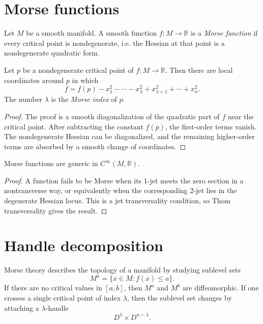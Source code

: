 \section{Morse functions}
\label{section-morse-functions}

\begin{definition}
\label{definition-morse-function}
Let $M$ be a smooth manifold.  A smooth
function $f:M\to\mathbb R$ is a
{\it Morse function} if every critical point
is nondegenerate, i.e. the Hessian at that
point is a nondegenerate quadratic form.
\end{definition}

\begin{theorem}
\label{theorem-morse-lemma}
Let $p$ be a nondegenerate critical point of
$f:M\to\mathbb R$.  Then there are local
coordinates around $p$ in which
$$
f=f(p)-x_1^2-\cdots-x_\lambda^2
+x_{\lambda+1}^2+\cdots+x_n^2.
$$
The number $\lambda$ is the {\it Morse index}
of $p$.
\end{theorem}

\begin{proof}
The proof is a smooth diagonalization of the
quadratic part of $f$ near the critical
point.  After subtracting the constant
$f(p)$, the first-order terms vanish.  The
nondegenerate Hessian can be diagonalized,
and the remaining higher-order terms are
absorbed by a smooth change of coordinates.
\end{proof}

\begin{theorem}
\label{theorem-morse-functions-generic}
Morse functions are generic in
$C^\infty(M,\mathbb R)$.
\end{theorem}

\begin{proof}
A function fails to be Morse when its 1-jet
meets the zero section in a nontransverse way,
or equivalently when the corresponding
2-jet lies in the degenerate Hessian locus.
This is a jet transversality condition, so
Thom transversality gives the result.
\end{proof}

\section{Handle decomposition}
\label{section-handle-decomposition}

\noindent
Morse theory describes the topology of a
manifold by studying sublevel sets
$$
M^a=\{x\in M:f(x)\leq a\}.
$$
If there are no critical values in
$[a,b]$, then $M^a$ and $M^b$ are
diffeomorphic.  If one crosses a single
critical point of index $\lambda$, then the
sublevel set changes by attaching a
$\lambda$-handle
$$
D^\lambda\times D^{n-\lambda}.
$$

